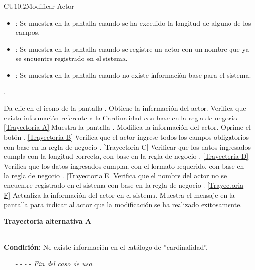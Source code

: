 \begin{UseCase}{CU10.2}{Modificar Actor}
{\begin{itemize}
		\item {}: Se muestra en la pantalla  cuando se ha excedido la longitud de alguno de los campos.
		\item {}: Se muestra en la pantalla  cuando se registre un actor con un nombre que ya se encuentre registrado en el sistema.
		\item {}: Se muestra en la pantalla  cuando no existe información base para el sistema.
		\end{itemize}.
		}
	\end{UseCase}
	\begin{UCtrayectoria}
		\UCpaso[\UCactor] Da clic en el icono \editar de la pantalla .
		\UCpaso[\UCsist] Obtiene la información del actor.
		\UCpaso[\UCactor] Verifica que exista información referente a la Cardinalidad con base en la regla de negocio . \hyperlink{CU10-2:TAA}{[Trayectoria A]}
		\UCpaso[\UCsist] Muestra la pantalla .
		\UCpaso[\UCactor] Modifica la información del actor. \label{CU10.2-P6}
		\UCpaso[\UCactor] Oprime el botón . \hyperlink{CU10-2:TAB}{[Trayectoria B]} 
		\UCpaso[\UCsist] Verifica que el actor ingrese todos los campos obligatorios con base en la regla de negocio . \hyperlink{CU10-2:TAC}{[Trayectoria C]}
		\UCpaso[\UCsist] Verificar que los datos ingresados cumpla con la longitud correcta, con base en la regla de negocio . \hyperlink{CU10-2:TAD}{[Trayectoria D]}
		\UCpaso[\UCsist] Verifica que los datos ingresados cumplan con el formato requerido, con base en la regla de negocio . \hyperlink{CU10-2:TAE}{[Trayectoria E]}
		\UCpaso[\UCsist] Verifica que el nombre del actor no se encuentre registrado en el sistema con base en la regla de negocio . \hyperlink{CU10-2:TAF}{[Trayectoria F]} 
		\UCpaso[\UCsist] Actualiza la información del actor en el sistema.
		\UCpaso[\UCsist] Muestra el mensaje  en la pantalla  para indicar al actor que la modificación se ha realizado exitosamente.
	\end{UCtrayectoria}		
\hypertarget{CU10-2:TAA}{\textbf{Trayectoria alternativa A}}\\
\noindent \textbf{Condición:} No existe información en el catálogo de ''cardinalidad''.
\begin{enumerate}
	\UCpaso[\UCactor] Muestra el mensaje  en la pantalla .
	\item[- -] - - {\em {Fin del caso de uso}}.%
\end{enumerate}

